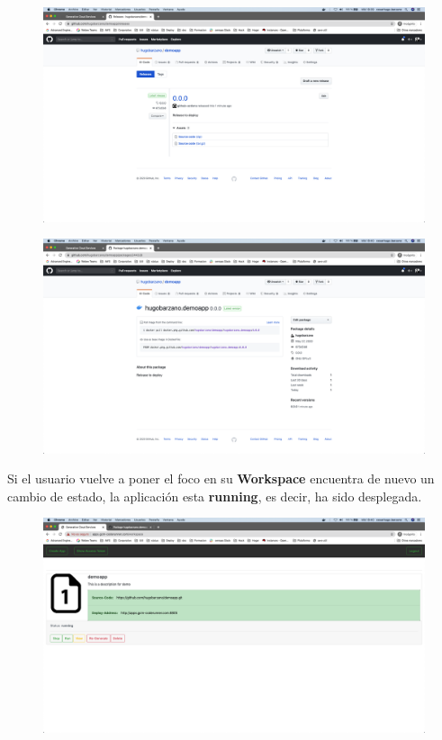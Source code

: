 \documentclass[a4paper,11pt]{book}
\begin{document}
\begin{figure}[H]
\centering
\includegraphics[scale=0.2]{imagenes/casouso/14.png}
\caption{   }
\end{figure}

\begin{figure}[H]
\centering
\includegraphics[scale=0.2]{imagenes/casouso/15.png}
\caption{   }
\end{figure}

Si el usuario vuelve a poner el foco en su \textbf{Workspace} encuentra de nuevo un cambio de estado, la aplicación esta \textbf{running}, es decir, ha sido desplegada. 
\begin{figure}[H]
\centering
\includegraphics[scale=0.2]{imagenes/casouso/16.png}
\caption{   }
\end{figure}
\end{document}
